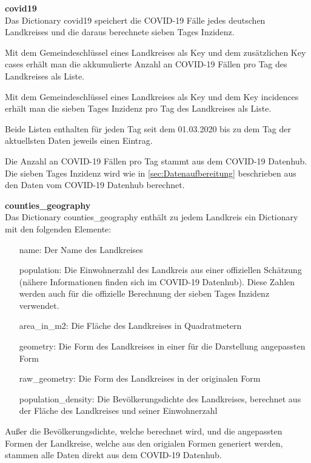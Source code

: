 \textbf{covid19}\\
Das Dictionary covid19 speichert die COVID-19 Fälle jedes deutschen Landkreises und die daraus berechnete sieben Tages Inzidenz.

Mit dem Gemeindeschlüssel eines Landkreises als Key und dem zusätzlichen Key \glqq{}cases\grqq{} erhält man die akkumulierte Anzahl an COVID-19 Fällen pro Tag des Landkreises als Liste.

Mit dem Gemeindeschlüssel eines Landkreises als Key und dem Key \glqq{}incidences\grqq{} erhält man die sieben Tages Inzidenz pro Tag des Landkreises als Liste.

Beide Listen enthalten für jeden Tag seit dem 01.03.2020 bis zu dem Tag der aktuellsten Daten jeweils einen Eintrag.

Die Anzahl an COVID-19 Fällen pro Tag stammt aus dem \glqq{}COVID-19 Datenhub\grqq{}. Die sieben Tages Inzidenz wird wie in \autoref{sec:Datenaufbereitung} beschrieben aus den Daten vom COVID-19 Datenhub berechnet.

\textbf{counties\_geography}\\
Das Dictionary counties\_geography enthält zu jedem Landkreis ein Dictionary mit den folgenden Elemente:
\begin{itemize}
    \item[name:] Der Name des Landkreises
    \item[population:] Die Einwohnerzahl des Landkreis aus einer offiziellen Schätzung (nähere Informationen finden sich im COVID-19 Datenhub). Diese Zahlen werden auch für die offizielle Berechnung der sieben Tages Inzidenz verwendet.
    \item[area\_in\_m2:] Die Fläche des Landkreises in Quadratmetern
    \item[geometry:] Die Form des Landkreises in einer für die Darstellung angepassten Form
    \item[raw\_geometry:] Die Form des Landkreises in der originalen Form
    \item[population\_density:] Die Bevölkerungsdichte des Landkreises, berechnet aus der Fläche des Landkreises und seiner Einwohnerzahl
\end{itemize}
Außer die Bevölkerungsdichte, welche berechnet wird, und die angepassten Formen der Landkreise, welche aus den origialen Formen generiert werden, stammen alle Daten direkt aus dem \glqq{}COVID-19 Datenhub\grqq{}.

